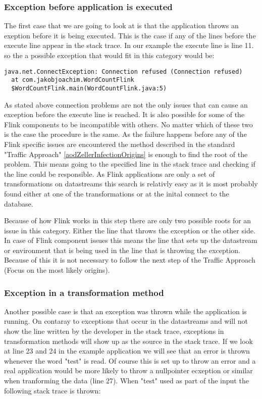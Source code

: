 \subsubsection{Exception before application is executed}
The first case that we are going to look at is that the application throws an exeption before it is being executed. This is the case if any of the lines before the execute line appear in the stack trace. In our example the execute line is line 11. so the a possible exception that would fit in this category would be:

\begin{lstlisting}
java.net.ConnectException: Connection refused (Connection refused)
  at com.jakobjoachim.WordCountFlink
  $WordCountFlink.main(WordCountFlink.java:5)
\end{lstlisting}

As stated above connection problems are not the only issues that can cause an exception before the execute line is reached. It is also possible for some of the Flink components to be incompatible with others. No matter which of these two is the case the procedure is the same. As the failure happens before any of the Flink specific issues are encountered the method described in the standard "Traffic Approach" \ref{aodZellerInfectionOrigins} is enough to find the root of the problem. This means going to the specified line in the stack trace and checking if the line could be responsible. As Flink applications are only a set of transformations on datastreams this search is relativly easy as it is most probably found either at one of the transformations or at the inital connect to the database.

Because of how Flink works in this step there are only two possible roots for an issue in this category. Either the line that throws the exception or the other side. In case of Flink component issues this means the line that sets up the datastream or environment that is being used in the line that is throwing the exception. Because of this it is not necessary to follow the next step of the Traffic Approach (Focus on the most likely origins).

\subsubsection{Exception in a transformation method}
Another possible case is that an exception was thrown while the application is running. On contaray to exceptions that occur in the datastreams and will not show the line written by the developer in the stack trace, exceptions in transformation methods will show up as the source in the stack trace. If we look at line 23 and 24 in the example application we will see that an error is thrown whenever the word "test" is read. Of course this is set up to throw an error and a real application would be more likely to throw a nullpointer ecxeption or similar when tranforming the data (line 27). When "test" used as part of the input the following stack trace is thrown:

